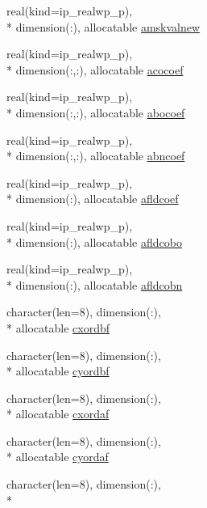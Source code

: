 \begin{DoxyCompactItemize}
\item 
real(kind=ip\+\_\+realwp\+\_\+p), \\*
dimension(\+:), allocatable \hyperlink{classmod__oasis__namcouple_a3598202174da65117caf675065f8b160}{amskvalnew}
\item 
real(kind=ip\+\_\+realwp\+\_\+p), \\*
dimension(\+:,\+:), allocatable \hyperlink{classmod__oasis__namcouple_a115cdfe0e05679107363605a992c6386}{acocoef}
\item 
real(kind=ip\+\_\+realwp\+\_\+p), \\*
dimension(\+:,\+:), allocatable \hyperlink{classmod__oasis__namcouple_a1b3f80e8e19f950b806636caadeb704b}{abocoef}
\item 
real(kind=ip\+\_\+realwp\+\_\+p), \\*
dimension(\+:,\+:), allocatable \hyperlink{classmod__oasis__namcouple_a211c98282b89859bee6da0ef60f0d484}{abncoef}
\item 
real(kind=ip\+\_\+realwp\+\_\+p), \\*
dimension(\+:), allocatable \hyperlink{classmod__oasis__namcouple_a19fb86d643bb8761d5a8e32d645d5963}{afldcoef}
\item 
real(kind=ip\+\_\+realwp\+\_\+p), \\*
dimension(\+:), allocatable \hyperlink{classmod__oasis__namcouple_aa9d178659282698ffb6c186ff48bed3c}{afldcobo}
\item 
real(kind=ip\+\_\+realwp\+\_\+p), \\*
dimension(\+:), allocatable \hyperlink{classmod__oasis__namcouple_a207709166cd4d719d65d76e6c043fd6c}{afldcobn}
\item 
character(len=8), dimension(\+:), \\*
allocatable \hyperlink{classmod__oasis__namcouple_a2ee5f8ec71ebae64c3d14445345d7545}{cxordbf}
\item 
character(len=8), dimension(\+:), \\*
allocatable \hyperlink{classmod__oasis__namcouple_ae1debe43f1c5cffeeb1d0d9ab563f4c4}{cyordbf}
\item 
character(len=8), dimension(\+:), \\*
allocatable \hyperlink{classmod__oasis__namcouple_ab52bc27bf5898cc85dce0fc60feb9320}{cxordaf}
\item 
character(len=8), dimension(\+:), \\*
allocatable \hyperlink{classmod__oasis__namcouple_a68de802180c51365e7d4bcc5180ac93b}{cyordaf}
\item 
character(len=8), dimension(\+:), \\*

\end{DoxyCompactItemize}
